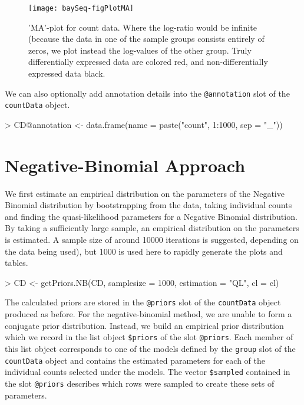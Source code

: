 \documentclass[a4paper]{article}
\begin{document}
\begin{figure}[!ht]
\begin{center}
\texttt{[image: baySeq-figPlotMA]}
\caption{'MA'-plot for count data. Where the log-ratio would be infinite (because the data in one of the sample groups consists entirely of zeros, we plot instead the log-values of the other group. Truly differentially expressed data are colored red, and non-differentially expressed data black.}
\label{figMA}
\end{center}
\end{figure}


We can also optionally add annotation details into the \verb'@annotation' slot of the \verb'countData' object.

\begin{Schunk}
\begin{Sinput}
> CD@annotation <- data.frame(name = paste("count", 1:1000, sep = "_"))
\end{Sinput}
\end{Schunk}

\section{Negative-Binomial Approach}

We first estimate an empirical distribution on the parameters of the Negative Binomial distribution by bootstrapping from the data, taking individual counts and finding the quasi-likelihood parameters for a Negative Binomial distribution. By taking a sufficiently large sample, an empirical distribution on the parameters is estimated. A sample size of around 10000 iterations is suggested, depending on the data being used), but 1000 is used here to rapidly generate the plots and tables.

\begin{Schunk}
\begin{Sinput}
> CD <- getPriors.NB(CD, samplesize = 1000, estimation = "QL", cl = cl)
\end{Sinput}
\end{Schunk}

The calculated priors are stored in the \verb'@priors' slot of the \verb'countData' object produced as before. For the negative-binomial method, we are unable to form a conjugate prior distribution. Instead, we build an empirical prior distribution which we record in the list object \verb'$priors' of the slot \verb'@priors'. Each member of this list object corresponds to one of the models defined by the \verb'group' slot of the \verb'countData' object and contains the estimated parameters for each of the individual counts selected under the models. The vector \verb'$sampled' contained in the slot \verb'@priors' describes which rows were sampled to create these sets of parameters.
\end{document}
